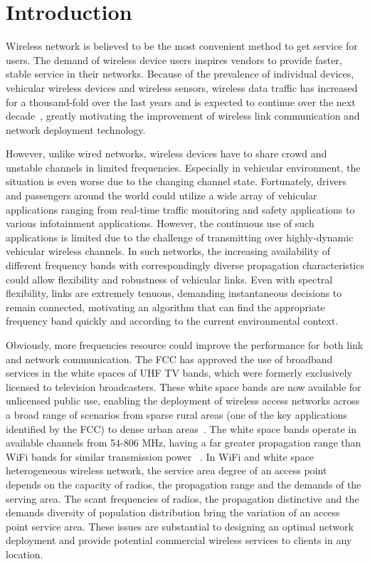\chapter{Introduction} \label{ch:introduction}

Wireless network is believed to be the most convenient method to get service 
for users. The demand of wireless device users inspires vendors to provide 
faster, stable service in their networks. Because of the prevalence of 
individual devices, vehicular wireless devices and wireless sensors, wireless 
data traffic has increased for a thousand-fold over the last years and is 
expected to continue over the next decade~\cite{metis}, greatly motivating 
the improvement of wireless link communication and network deployment technology.

However, unlike wired networks, wireless devices have to share crowd
and unstable channels in limited frequencies. Especially in vehicular
environment, the situation is even worse due to the changing channel 
state. Fortunately, drivers and passengers around the world could utilize a 
wide array of vehicular applications ranging from real-time traffic 
monitoring and safety applications to various infotainment applications.
However, the continuous use of such applications is limited due to the
challenge of transmitting over highly-dynamic vehicular wireless channels.
In such networks, the increasing availability of different frequency bands 
with correspondingly diverse propagation characteristics could allow flexibility 
and robustness of vehicular links. Even with spectral flexibility, links are 
extremely tenuous, demanding instantaneous decisions to remain connected, 
motivating an algorithm that can find the appropriate frequency band quickly 
and according to the current environmental context.

Obviously, more frequencies resource could improve the performance for 
both link and network communication. The FCC has approved the use of broadband 
services in the white spaces of UHF TV bands, which were formerly exclusively 
licensed to television broadcasters. These white space bands are now available 
for unlicensed public use, enabling the deployment of wireless access networks 
across a broad range of scenarios from sparse rural areas (one of the key 
applications identified by the FCC) to dense urban areas~\cite{carlson}. The 
white space bands operate in available channels from 54-806 MHz, having a far 
greater propagation range than WiFi bands for similar transmission power
~\cite{balanis2012antenna}. In WiFi and white space heterogeneous wireless 
network, the service area degree of an access point depends on the capacity 
of radios, the propagation range and the demands of the serving area. The scant 
frequencies of radios, the propagation distinctive and the demands diversity 
of population distribution bring the variation of an access point service area. 
These issues are substantial to designing an optimal network deployment and 
provide potential commercial wireless services to clients in any location.

